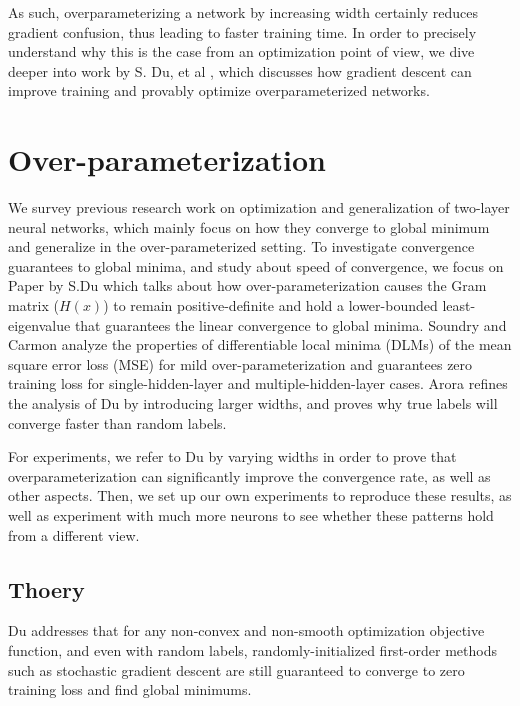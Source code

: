 \documentclass{article}
\begin{document}
As such, overparameterizing a network by increasing width certainly reduces gradient confusion, thus leading to faster training time. In order to precisely understand why this is the case from an optimization point of view, we dive deeper into work by S. Du, et al \cite{SimonDu}, which discusses how gradient descent can improve training and provably optimize overparameterized networks.

\section{Over-parameterization}
We survey previous research work on optimization and generalization of two-layer neural networks, which mainly focus on how they converge to global minimum and generalize in the over-parameterized setting. To investigate convergence guarantees to global minima, and study about speed of convergence, we focus on Paper \cite{SimonDu} by S.Du which talks about how over-parameterization causes the Gram matrix ($H(x)$) to remain positive-definite and hold a lower-bounded least-eigenvalue that guarantees the linear convergence to global minima. Soundry and Carmon \cite{SoudryCarmon} analyze the properties of differentiable local minima (DLMs) of the mean square error loss (MSE) for mild over-parameterization and guarantees zero training loss for single-hidden-layer and multiple-hidden-layer cases. Arora \cite{Arora} refines the analysis of Du \cite{SimonDu} by introducing larger widths, and proves why true labels will converge faster than random labels. 

For experiments, we refer to Du \cite{SimonDu} by varying widths in order to prove that overparameterization can significantly improve the convergence rate, as well as other aspects. Then, we set up our own experiments to reproduce these results, as well as experiment with much more neurons to see whether these patterns hold from a different view. 

\subsection{Thoery}
Du \cite{SimonDu} addresses that for any non-convex and non-smooth optimization objective function, and even with random labels, randomly-initialized first-order methods such as stochastic gradient descent are still guaranteed to converge to zero training loss and find global minimums.\\
\end{document}
